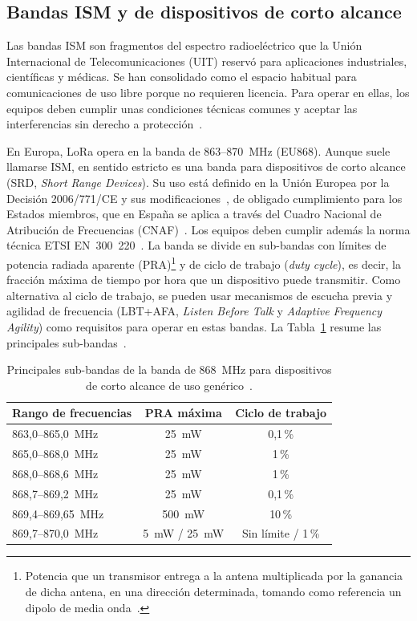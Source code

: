 \subsection{Bandas ISM y de dispositivos de corto alcance}
\label{subsec:banda-ism}

Las bandas ISM son fragmentos del espectro radioeléctrico que la Unión Internacional de Telecomunicaciones (UIT) reservó para aplicaciones industriales, científicas y médicas. Se han consolidado como el espacio habitual para comunicaciones de uso libre porque no requieren licencia. Para operar en ellas, los equipos deben cumplir unas condiciones técnicas comunes y aceptar las interferencias sin derecho a protección~\cite{uitrr}.

En Europa, LoRa opera en la banda de 863--870~MHz (EU868). Aunque suele llamarse ISM, en sentido estricto es una banda para dispositivos de corto alcance (SRD, \textit{Short Range Devices}). Su uso está definido en la Unión Europea por la Decisión 2006/771/CE y sus modificaciones~\cite{decision2006771,decision20191345}, de obligado cumplimiento para los Estados miembros, que en España se aplica a través del Cuadro Nacional de Atribución de Frecuencias (CNAF)~\cite{cnaf2026}. Los equipos deben cumplir además la norma técnica ETSI EN~300~220~\cite{etsien3002202}. La banda se divide en sub-bandas con límites de potencia radiada aparente (PRA)\footnote{Potencia que un transmisor entrega a la antena multiplicada por la ganancia de dicha antena, en una dirección determinada, tomando como referencia un dipolo de media onda~\cite{raing_pra}.} y de ciclo de trabajo (\textit{duty cycle}), es decir, la fracción máxima de tiempo por hora que un dispositivo puede transmitir. Como alternativa al ciclo de trabajo, se pueden usar mecanismos de escucha previa y agilidad de frecuencia (LBT+AFA, \textit{Listen Before Talk} y \textit{Adaptive Frequency Agility}) como requisitos para operar en estas bandas. La Tabla~\ref{tab:subbandas-868} resume las principales sub-bandas~\cite{ercrec7003}.
\begin{table}[htbp]
    \centering
    \caption{Principales sub-bandas de la banda de 868~MHz para dispositivos de corto alcance de uso genérico~\cite{ercrec7003}.}
    \label{tab:subbandas-868}
    \renewcommand{\arraystretch}{1.3}
    \begin{tabular}{l c c}
        \toprule
        \textbf{Rango de frecuencias} & \textbf{PRA máxima} & \textbf{Ciclo de trabajo} \\
        \midrule
        863,0--865,0~MHz & 25~mW & 0,1\,\% \\
        865,0--868,0~MHz & 25~mW & 1\,\% \\
        868,0--868,6~MHz & 25~mW & 1\,\% \\
        868,7--869,2~MHz & 25~mW & 0,1\,\% \\
        869,4--869,65~MHz & 500~mW & 10\,\% \\
        869,7--870,0~MHz & 5~mW / 25~mW & Sin límite / 1\,\% \\
        \bottomrule
    \end{tabular}
\end{table}

